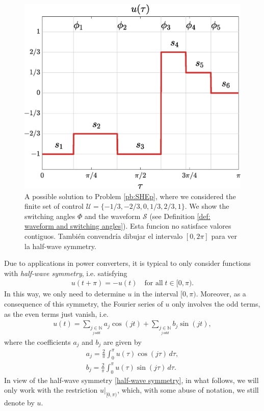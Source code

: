 \documentclass[twocolumn]{autart}    %
\begin{document}
\begin{figure}[h]
	\centering
	\includegraphics[scale=0.35]{img/fig01.eps} 
	\caption{A possible solution to Problem \ref{pb:SHEp}, where we considered the finite set of control $\mathcal{U} = \{-1/3, -2/3, 0, 1/3, 2/3, 1\}$. We show the switching angles $\Phi$ and the waveform $\mathcal{S}$ (see Definition \ref{def: waveform and switching angles}).{\color{red} Esta funcion no satisface valores contiguos. También convendría dibujar el intervalo $[0,2\pi]$ para ver la half-wave symmetry. } }
	\label{fig:exampleSHE}
\end{figure}
Due to applications in power converters,  it is typical to only consider functions with \textit{half-wave symmetry}, i.e. satisfying
\begin{align}\label{half-wave symmetry}
	u(t + \pi) = -u(t)\quad \mbox{for all}\; t \in [0,\pi).
\end{align}
In this way, we only need to determine $u$ in the interval $[0,\pi)$. Moreover, as a consequence of this symmetry, the Fourier series of $u$ only involves the odd terms, as the even terms just vanish, i.e.
\begin{align*}
	u(t) = \sum_{\underset{j\, odd}{j \in \mathbb{N}}} a_j \cos(jt)+ \sum_{\underset{j\, odd}{j \in \mathbb{N}}}  b_j \sin(jt),
\end{align*}
where the coefficients $a_j$ and $b_j$ are given by
\begin{equation} \label{eq:an}
	\begin{aligned}
		a_j = \frac{2}{\pi} \int_0^\pi u(\tau ) \cos(j \tau)\,d\tau, 
		\\[5pt]
		b_j = \frac{2}{\pi} \int_0^\pi u(\tau)  \sin(j \tau)\,d\tau.
	\end{aligned}
\end{equation}
In view of the half-wave symmetry \eqref{half-wave symmetry}, in what follows, we will only work with the restriction $u|_{[0,\pi)}$, which, with some abuse of notation, we still denote by $u$. 
\end{document}
